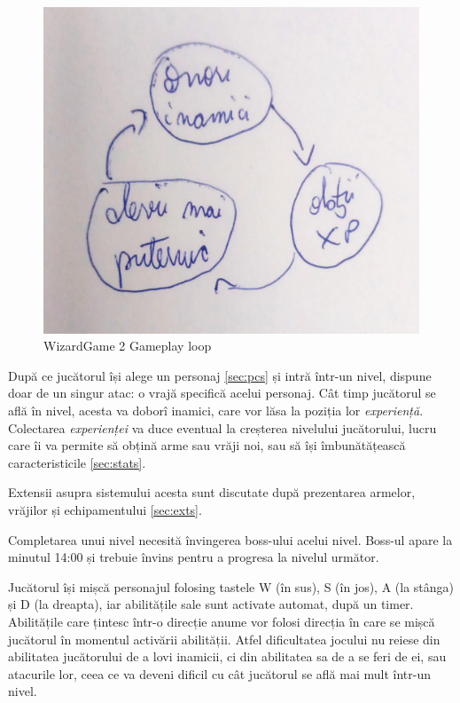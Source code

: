 \documentclass{article}
\begin{document}
    \begin{figure}[h]
        \includegraphics[scale=0.125]{gameplayloop}
        \centering
        \caption{WizardGame 2 Gameplay loop}
    \end{figure}

    După ce jucătorul își alege un personaj \ref{sec:pcs} și intră într-un nivel, dispune
    doar de un singur atac: o vrajă specifică acelui personaj. Cât timp jucătorul se află
    în nivel, acesta va doborî inamici, care vor lăsa la poziția lor \emph{experiență}.
    Colectarea \emph{experienței} va duce eventual la creșterea nivelului jucătorului, lucru
    care îi va permite să obțină arme sau vrăji noi, sau să își îmbunătățească caracteristicile
    \ref{sec:stats}.

    Extensii asupra sistemului acesta sunt discutate după prezentarea armelor, vrăjilor și
    echipamentului \ref{sec:exts}.

    Completarea unui nivel necesită învingerea boss-ului acelui nivel. Boss-ul apare la
    minutul 14:00 și trebuie învins pentru a progresa la nivelul următor.

    Jucătorul își mișcă personajul folosing tastele W (în sus), S (în jos), A (la stânga) și D
    (la dreapta), iar abilitățile sale sunt activate automat, după un timer. Abilitățile care
    țintesc într-o direcție anume vor folosi direcția în care se mișcă jucătorul în momentul
    activării abilității. Atfel dificultatea jocului nu reiese din abilitatea jucătorului de a lovi
    inamicii, ci din abilitatea sa de a se feri de ei, sau atacurile lor, ceea ce va deveni dificil
    cu cât jucătorul se află mai mult într-un nivel.
\end{document}
